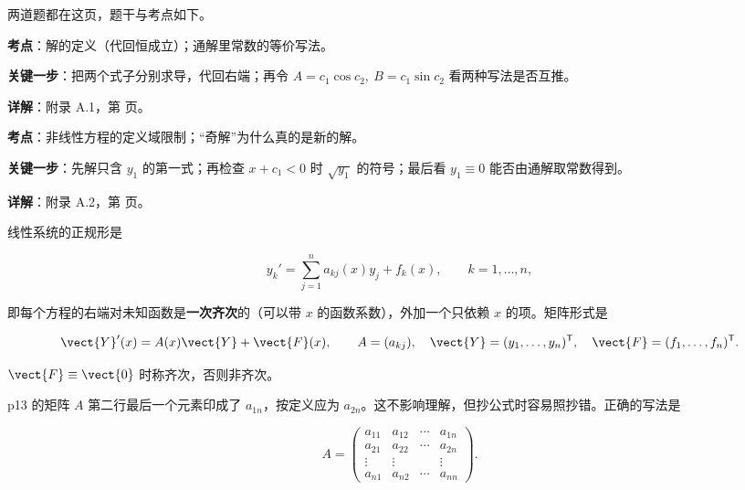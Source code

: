 \documentclass[11pt]{ctexart}
\renewcommand{\qbreak}{\needspace{0.26\textheight}}
\newcommand{\mat}[1]{\begin{pmatrix}#1\end{pmatrix}}
\begin{document}

两道题都在这页，题干与考点如下。

\qbreak
{}
\par\textbf{考点}：解的定义（代回恒成立）；通解里常数的等价写法。
\par\textbf{关键一步}：把两个式子分别求导，代回右端；再令 $A=c_1\cos c_2,\ B=c_1\sin c_2$ 看两种写法是否互推。
\par\textbf{详解}：附录 A.1，第 \pageref{c1:app:a1} 页。

\qbreak
{}
\par\textbf{考点}：非线性方程的定义域限制；“奇解”为什么真的是新的解。
\par\textbf{关键一步}：先解只含 $y_1$ 的第一式；再检查 $x+c_1<0$ 时 $\sqrt{y_1}$ 的符号；最后看 $y_1\equiv0$ 能否由通解取常数得到。
\par\textbf{详解}：附录 A.2，第 \pageref{c1:app:a2} 页。



线性系统的正规形是

\[
y_k'=\sum_{j=1}^{n}a_{kj}(x)y_j+f_k(x),\qquad k=1,\dots,n,
\]

即每个方程的右端对未知函数是\textbf{一次齐次}的（可以带 $x$ 的函数系数），外加一个只依赖 $x$ 的项。矩阵形式是

\[
\vect{Y}'(x)=A(x)\vect{Y}+\vect{F}(x),\qquad
A=(a_{kj}),\quad \vect{Y}=(y_1,\dots,y_n)^{\mathsf T},\quad \vect{F}=(f_1,\dots,f_n)^{\mathsf T}.
\]

$\vect{F}\equiv\vect{0}$ 时称齐次，否则非齐次。


p13 的矩阵 $A$ 第二行最后一个元素印成了 $a_{1n}$，按定义应为 $a_{2n}$。这不影响理解，但抄公式时容易照抄错。正确的写法是

\[
A=\mat{
a_{11} & a_{12} & \cdots & a_{1n}\\
a_{21} & a_{22} & \cdots & a_{2n}\\
\vdots & \vdots & & \vdots\\
a_{n1} & a_{n2} & \cdots & a_{nn}}.
\]
\end{document}
